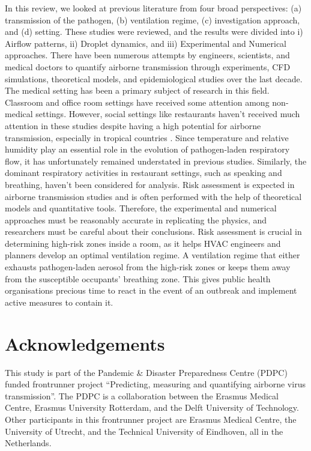\documentclass[a4paper,12pt]{elsarticle}
\begin{document}
In this review, we looked at previous literature from four broad perspectives: (a) transmission of the pathogen, (b) ventilation regime, (c) investigation approach, and (d) setting. These studies were reviewed, and the results were divided into i) Airflow patterns, ii) Droplet dynamics, and iii) Experimental and Numerical approaches. There have been numerous attempts by engineers, scientists, and medical doctors to quantify airborne transmission through experiments, CFD simulations, theoretical models, and epidemiological studies over the last decade. The medical setting has been a primary subject of research in this field. Classroom and office room settings have received some attention among non-medical settings. However, social settings like restaurants haven't received much attention in these studies despite having a high potential for airborne transmission, especially in tropical countries \cite{prata2020temperature}. Since temperature and relative humidity play an essential role in the evolution of pathogen-laden respiratory flow, it has unfortunately remained understated in previous studies. Similarly, the dominant respiratory activities in restaurant settings, such as speaking and breathing, haven't been considered for analysis. Risk assessment is expected in airborne transmission studies and is often performed with the help of theoretical models and quantitative tools. Therefore, the experimental and numerical approaches must be reasonably accurate in replicating the physics, and researchers must be careful about their conclusions. Risk assessment is crucial in determining high-risk zones inside a room, as it helps HVAC engineers and planners develop an optimal ventilation regime. A ventilation regime that either exhausts pathogen-laden aerosol from the high-risk zones or keeps them away from the susceptible occupants' breathing zone. This gives public health organisations precious time to react in the event of an outbreak and implement active measures to contain it.



\section*{Acknowledgements}

This study is part of the Pandemic \& Disaster Preparedness Centre (PDPC) funded frontrunner project “Predicting, measuring and quantifying airborne virus transmission”. The PDPC is a collaboration between the Erasmus Medical Centre, Erasmus University Rotterdam, and the Delft University of Technology. Other participants in this frontrunner project are Erasmus Medical Centre, the University of Utrecht, and the Technical University of Eindhoven, all in the Netherlands.
\end{document}
